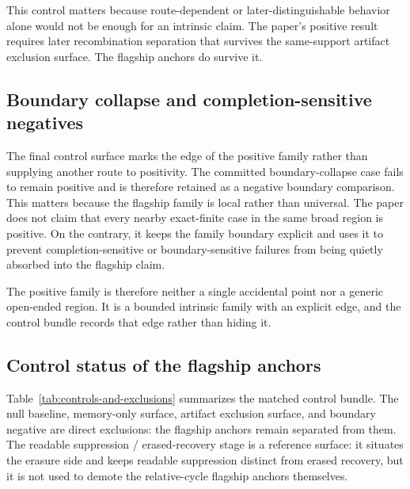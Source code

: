 \documentclass[11pt]{article}
\theoremstyle{definition}
\begin{document}
This control matters because route-dependent or later-distinguishable behavior alone would not be enough for an intrinsic claim. The paper's positive result requires later recombination separation that survives the same-support artifact exclusion surface. The flagship anchors do survive it.

\subsection{Boundary collapse and completion-sensitive negatives}

The final control surface marks the edge of the positive family rather than supplying another route to positivity. The committed boundary-collapse case fails to remain positive and is therefore retained as a negative boundary comparison. This matters because the flagship family is local rather than universal. The paper does not claim that every nearby exact-finite case in the same broad region is positive. On the contrary, it keeps the family boundary explicit and uses it to prevent completion-sensitive or boundary-sensitive failures from being quietly absorbed into the flagship claim.

The positive family is therefore neither a single accidental point nor a generic open-ended region. It is a bounded intrinsic family with an explicit edge, and the control bundle records that edge rather than hiding it.

\subsection{Control status of the flagship anchors}

Table~\ref{tab:controls-and-exclusions} summarizes the matched control bundle. The null baseline, memory-only surface, artifact exclusion surface, and boundary negative are direct exclusions: the flagship anchors remain separated from them. The readable suppression / erased-recovery stage is a reference surface: it situates the erasure side and keeps readable suppression distinct from erased recovery, but it is not used to demote the relative-cycle flagship anchors themselves.
\end{document}
